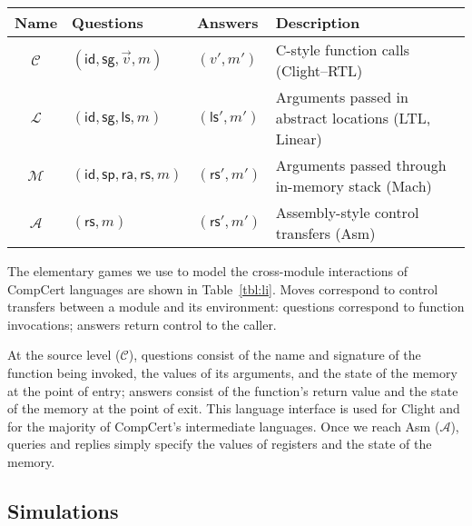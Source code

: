 \documentclass[acmsmall,timestamp,review,anonymous]{acmart}
\newcommand{\kw}[1]{\ensuremath{ \mathsf{#1} }}
\begin{document}
\begin{table*} %
  \footnotesize
  \begin{tabular}{clll}
    \hline
    Name & Questions & Answers & Description \\
    \hline
    $\mathcal{C}$ & $(\kw{id}, \kw{sg}, \vec{v}, m)$ & $(v', m')$ &
      C-style function calls (Clight--RTL) \\
    $\mathcal{L}$ & $(\kw{id}, \kw{sg}, \kw{ls}, m)$ & $(\kw{ls}', m')$ &
      Arguments passed in abstract locations (LTL, Linear) \\
    $\mathcal{M}$ & $(\kw{id}, \kw{sp},\kw{ra},\kw{rs}, m)$ & $(\kw{rs}', m')$ &
      Arguments passed through in-memory stack (Mach) \\
    $\mathcal{A}$ & $(\kw{rs}, m)$ & $(\kw{rs}', m')$ &
      Assembly-style control transfers (Asm) \\
    \hline
  \end{tabular}
  \caption{Language interfaces for the various languages of CompCert.}
  \label{tbl:li}
\end{table*}

The elementary games we use to model
the cross-module interactions of CompCert languages
are shown in Table~\ref{tbl:li}.
Moves correspond to control transfers
between a module and its environment:
questions correspond to function invocations;
answers return control to the caller.

At the source level ($\mathcal{C}$),
questions consist of
the name and signature of the function being invoked,
the values of its arguments,
and the state of the memory at the point of entry;
answers
consist of the function's return value
and the state of the memory at the point of exit.
This language interface is used for Clight and
for the majority of CompCert's intermediate languages.
Once we reach Asm ($\mathcal{A}$),
queries and replies simply specify
the values of registers and the state of the memory.


\subsection{Simulations} %
\end{document}

